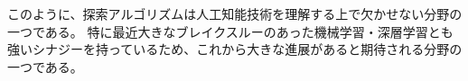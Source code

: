 このように、探索アルゴリズムは人工知能技術を理解する上で欠かせない分野の一つである。
特に最近大きなブレイクスルーのあった機械学習・深層学習とも強いシナジーを持っているため、これから大きな進展があると期待される分野の一つである。


\begin{comment}
\section{アルゴリズムの概略図}
\label{sec:cheatsheet}

ここでは大まかに問題の特徴に対してどのようなアルゴリズムを最初に試すべきかの概略を示す。
ここで紹介する手法が常に優れているわけではない。が、最初に考慮する価値はあるだろう。
つまり、ここではその問題に当てはまらないとされた手法だからといって有用ではないということはない。
各章を読んでみて、適用可能かを読んでみたい。

\begin{enumerate}
\item 同じ状態に至る経路がたくさんある
	\begin{enumerate}
	\item YES: グラフ探索アルゴリズム
	\item NO: 木探索アルゴリズム (e.g. IDA*)
	\item SOSO: IDA* with transposition table
	\end{enumerate}
	
\item 問題の特徴がある程度分かっておりヒューリスティック関数が作れる
	\begin{enumerate}
	\item YES: ヒューリスティック探索
	\item NO: ブラインド探索
	\end{enumerate}

\item 最適解ではなくある程度良い解なら十分である
	\begin{enumerate}
	\item YES: 局所探索、weighted A*
	\item NO: A*
	\end{enumerate}

\item 最適解と比べてどのくらい良い解かの保証が必要である
	\begin{enumerate}
	\item YES: weighted A*
	\item NO: Greedy best first search
	\end{enumerate}


\end{comment}
